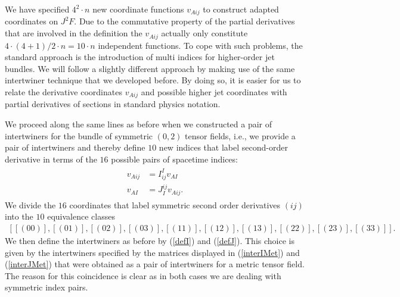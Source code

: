 \documentclass[a4paper,12pt, DIV=14, BCOR=5mm, twoside, headsepline, numbers=noenddot]{scrbook}
\begin{document}
We have specified $4^2\cdot n$ new coordinate functions $v_{Aij}$ to construct adapted coordinates on $J^2F$. Due to the commutative property of the partial derivatives that are involved in the definition the $v_{Aij}$ actually only constitute $4\cdot (4+1)/2 \cdot n = 10\cdot n$ independent functions. To cope with such problems, the standard approach is the introduction of multi indices for higher-order jet bundles. We will follow a slightly different approach by making use of the same intertwiner technique that we developed before. By doing so, it is easier for us to relate the derivative coordinates $v_{Aij}$ and possible higher jet coordinates with partial derivatives of sections in standard physics notation. 

We proceed along the same lines as before when we constructed a pair of intertwiners for the bundle of symmetric $(0,2)$ tensor fields, i.e., we provide a pair of intertwiners and thereby define $10$ new indices that label second-order derivative in terms of the $16$ possible pairs of spacetime indices:
\begin{align}
    \begin{aligned}
    v_{Aij} &= I^I_{ij} v_{AI}\\
    v_{AI} &= J_I^{ij} v_{Aij}.
    \end{aligned}
\end{align}
We divide the $16$ coordinates that label symmetric second order derivatives $(ij)$ into the $10$ equivalence classes 
\begin{align}
    \left [[(00)],[(01)],[(02)],[(03)],[(11)],[(12)],[(13)],[(22)],[(23)],[(33)] \right ].
\end{align}
We then define the intertwiners as before by (\ref{defI}) and (\ref{defJ}). 
This choice is given by the intertwiners specified by the matrices displayed in (\ref{interIMet}) and (\ref{interJMet}) that were obtained as a pair of intertwiners for a metric tensor field. The reason for this coincidence is clear as in both cases we are dealing with symmetric index pairs. 
\end{document}
